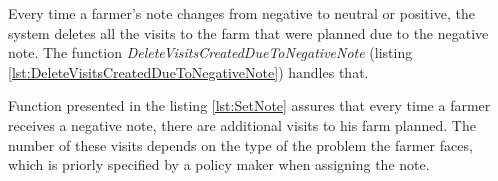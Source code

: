 Every time a farmer's note changes from negative to neutral or positive, the system deletes all the visits to the farm that were planned due to the negative note. The function \textit{DeleteVisitsCreatedDueToNegativeNote} (listing \ref{lst:DeleteVisitsCreatedDueToNegativeNote}) handles that.



Function presented in the listing \ref{lst:SetNote} assures that every time a farmer receives a negative note, there are additional visits to his farm planned. The number of these visits depends on the type of the problem the farmer faces, which is priorly specified by a policy maker when assigning the note.

